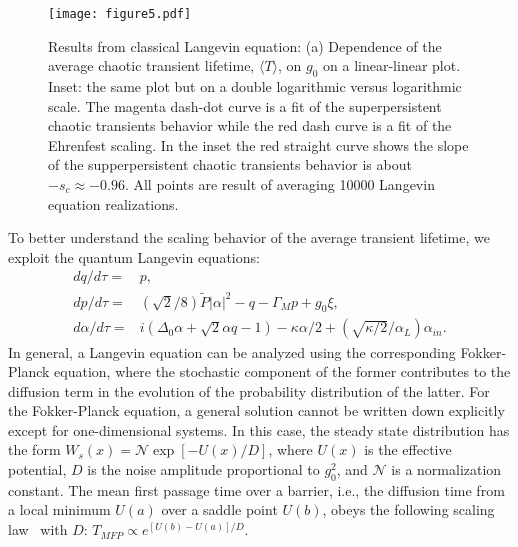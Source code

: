 \documentclass[12pt]{wlscirep}
\begin{document}
\begin{figure}
\centering
\texttt{[image: figure5.pdf]}
\caption{Results from classical Langevin equation: (a) Dependence of
the average chaotic transient lifetime, $\langle T\rangle$, on $g_0$ on
a linear-linear plot. Inset: the same plot but on a double logarithmic
versus logarithmic scale. The magenta dash-dot curve is a fit of the
superpersistent chaotic transients behavior while the red dash curve
is a fit of the Ehrenfest scaling. In the inset the red straight curve
shows the slope of the supperpersistent chaotic transients behavior is
about $-s_c\approx -0.96$. All points are result of averaging 10000
Langevin equation realizations.}
\label{fig:cla_scaling}
\end{figure}

To better understand the scaling behavior of the average transient
lifetime, we exploit the quantum Langevin equations:
\begin{equation}
\begin{split}
dq/d\tau=&p, \\
dp/d\tau=&(\sqrt{2}/8)\tilde{P}|\alpha|^2-q-\Gamma_Mp+g_0\xi, \\
d\alpha/d\tau=&i(\Delta_0\alpha+\sqrt{2}\alpha q-1)-\kappa
\alpha/2+(\sqrt{\kappa/2}/\alpha_L)\alpha_{in}. 
\end{split}
\end{equation}
In general, a Langevin equation can be analyzed using the corresponding
Fokker-Planck equation, where the stochastic component of the former 
contributes to the diffusion term in the evolution of the probability
distribution of the latter.
For the Fokker-Planck equation, a general solution cannot be written
down explicitly except for one-dimensional systems. In this case, the steady
state distribution has the form $W_s(x)=\mathcal{N}\exp{[-U(x)/D]}$, where
$U(x)$ is the effective potential, $D$ is the noise amplitude proportional 
to $g_0^2$, and $\mathcal{N}$ is a normalization constant. The mean
first passage time over a barrier, i.e., the diffusion time from a local 
minimum $U(a)$ over a saddle point $U(b)$, obeys the following scaling
law~\cite{Gardiner:book} with $D$: $T_{MFP}\propto e^{[U(b)-U(a)]/D}$. 
\end{document}

